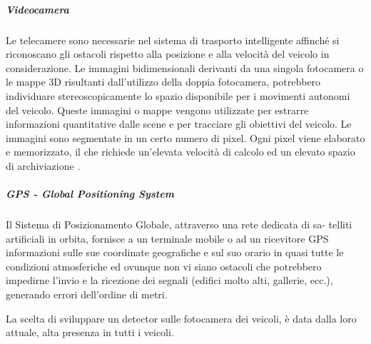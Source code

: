 \documentclass[14pt]{extarticle}
\begin{document}
\subparagraph{Videocamera}
Le telecamere sono necessarie nel sistema di trasporto intelligente affinché si riconoscano gli ostacoli rispetto alla posizione e alla velocità del
veicolo in considerazione. Le immagini bidimensionali derivanti da una
singola fotocamera o le mappe 3D risultanti dall’utilizzo della doppia
fotocamera, potrebbero individuare stereoscopicamente lo spazio disponibile per i movimenti autonomi del veicolo. Queste immagini o mappe
vengono utilizzate per estrarre informazioni quantitative dalle scene e
per tracciare gli obiettivi del veicolo. Le immagini sono segmentate in un
certo numero di pixel. Ogni pixel viene elaborato e memorizzato, il che richiede un’elevata velocità di calcolo ed un elevato spazio di archiviazione
\cite{das2018risk}.

\subparagraph{GPS - Global Positioning System}
Il Sistema di Posizionamento Globale, attraverso una rete dedicata di sa-
telliti artificiali in orbita, fornisce a un terminale mobile o ad un ricevitore
GPS informazioni sulle sue coordinate geografiche e sul suo orario in
quasi tutte le condizioni atmosferiche ed ovunque non vi siano ostacoli
che potrebbero impedirne l’invio e la ricezione dei segnali (edifici molto
alti, gallerie, ecc.), generando errori dell'ordine di metri.

La scelta di sviluppare un detector sulle fotocamera dei veicoli, è data dalla loro  attuale, alta presenza in tutti i veicoli.
\end{document}
